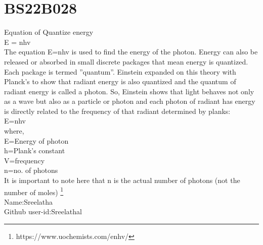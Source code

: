 \section{BS22B028}
Equation of Quantize energy\\
E = nhv\\
The equation E=nhv is used to find the energy of the photon. Energy can also be released or absorbed in small discrete packages that mean energy is quantized. Each
package is termed ”quantum”. Einstein expanded on this theory with Planck’s to show that radiant energy is also quantized and the quantum of radiant energy is called
a photon. So, Einstein shows that light behaves not only as a wave but also as a particle or photon and each photon of radiant has energy is directly related to the
frequency of that radiant determined by planks:\\
E=nhv\\
where,\\
E=Energy of photon\\
h=Plank’s constant\\
V=frequency\\
n=no. of photons\\
It is important to note here that n is the actual number of photons (not the number of moles) \footnote{https://www.uochemists.com/enhv/}\\
Name:Sreelatha\\
Github user-id:Sreelathal

